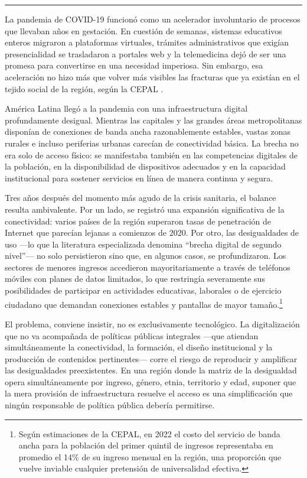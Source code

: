 \documentclass{article}
\begin{document}
\bigskip
\noindent\rule{\linewidth}{0.4pt}
\bigskip

La pandemia de COVID-19 funcionó como un acelerador involuntario de procesos que llevaban años en gestación. En cuestión de semanas, sistemas educativos enteros migraron a plataformas virtuales, trámites administrativos que exigían presencialidad se trasladaron a portales web y la telemedicina dejó de ser una promesa para convertirse en una necesidad imperiosa. Sin embargo, esa aceleración no hizo más que volver más visibles las fracturas que ya existían en el tejido social de la región, según la CEPAL \autocite{2566-CEPAL2021}.

América Latina llegó a la pandemia con una infraestructura digital profundamente desigual. Mientras las capitales y las grandes áreas metropolitanas disponían de conexiones de banda ancha razonablemente estables, vastas zonas rurales e incluso periferias urbanas carecían de conectividad básica. La brecha no era solo de acceso físico: se manifestaba también en las competencias digitales de la población, en la disponibilidad de dispositivos adecuados y en la capacidad institucional para sostener servicios en línea de manera continua y segura.

Tres años después del momento más agudo de la crisis sanitaria, el balance resulta ambivalente. Por un lado, se registró una expansión significativa de la conectividad: varios países de la región superaron tasas de penetración de Internet que parecían lejanas a comienzos de 2020. Por otro, las desigualdades de uso —lo que la literatura especializada denomina “brecha digital de segundo nivel”— no solo persistieron sino que, en algunos casos, se profundizaron. Los sectores de menores ingresos accedieron mayoritariamente a través de teléfonos móviles con planes de datos limitados, lo que restringía severamente sus posibilidades de participar en actividades educativas, laborales o de ejercicio ciudadano que demandan conexiones estables y pantallas de mayor tamaño.\footnote{Según estimaciones de la CEPAL, en 2022 el costo del servicio de
banda ancha para la población del primer quintil de ingresos
representaba en promedio el 14\% de su ingreso mensual en la región, una
proporción que vuelve inviable cualquier pretensión de universalidad
efectiva.}

El problema, conviene insistir, no es exclusivamente tecnológico. La digitalización que no va acompañada de políticas públicas integrales —que atiendan simultáneamente la conectividad, la formación, el diseño institucional y la producción de contenidos pertinentes— corre el riesgo de reproducir y amplificar las desigualdades preexistentes. En una región donde la matriz de la desigualdad opera simultáneamente por ingreso, género, etnia, territorio y edad, suponer que la mera provisión de infraestructura resuelve el acceso es una simplificación que ningún responsable de política pública debería permitirse.
\end{document}
